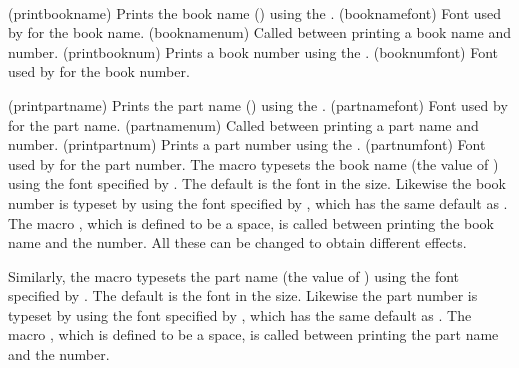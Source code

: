 \begin{syntax}
\cmd{\printbookname} \cmd{\booknamefont} \\
\cmd{\booknamenum} \\
\cmd{\printbooknum} \cmd{\booknumfont} \\
\cmd{\printpartname} \cmd{\partnamefont} \\
\cmd{\partnamenum} \\
\cmd{\printpartnum} \cmd{\partnumfont} \\
\end{syntax}
\glossary(printbookname)%
  {}
  {Prints the book name () using the .}
\glossary(booknamefont)%
  {}%
  {Font used by  for the book name.}
\glossary(booknamenum)%
  {}%
  {Called between printing a book name and number.}
\glossary(printbooknum)%
  {}%
  {Prints a book number using the .}
\glossary(booknumfont)%
  {}%
  {Font used by  for the book number.}

\glossary(printpartname)%
  {}
  {Prints the part name () using the .}
\glossary(partnamefont)%
  {}%
  {Font used by  for the part name.}
\glossary(partnamenum)%
  {}%
  {Called between printing a part name and number.}
\glossary(printpartnum)%
  {}%
  {Prints a part number using the .}
\glossary(partnumfont)%
  {}%
  {Font used by  for the part number.}
The macro \cmd{\printbookname} typesets the book name (the value of
\cmd{\bookname}) using the font specified by \cmd{\booknamefont}.
The default is the \cmd{\bfseries} font in the \cmd{\huge} size.
Likewise the book number is typeset by \cmd{\printbooknum}
using the font specified by \cmd{\booknumfont}, which has the same default as
\cmd{\booknamefont}. The macro \cmd{\booknamenum}, which is defined to be
a space, is called between printing the book name and the number. All
these can be changed to obtain different effects.

    Similarly, the macro \cmd{\printpartname} typesets the part name
(the value of \cmd{\partname}) using the font specified by
\cmd{\partnamefont}. The default is the \cmd{\bfseries} font in
the \cmd{\huge} size. Likewise the part number is typeset by
\cmd{\printpartnum} using the font specified by \cmd{\partnumfont},
which has the same default as \cmd{\partnamefont}. The macro
\cmd{\partnamenum}, which is defined to be a space, is called between printing
the part name and the number.

